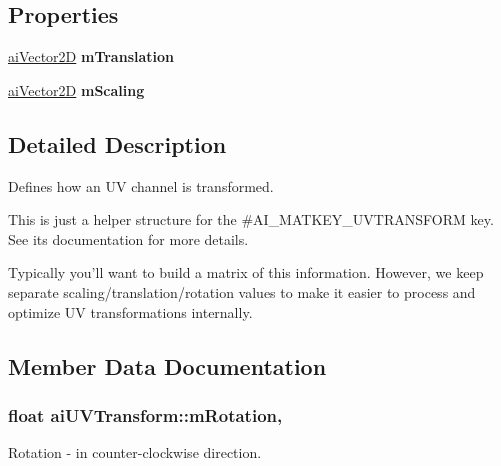 \subsection*{Properties}
\begin{DoxyCompactItemize}
\item 
\hypertarget{structai_u_v_transform_af110a480a92019dc2007ccee661f3029}{\hyperlink{structai_vector2_d}{ai\+Vector2\+D} {\bfseries m\+Translation}}\label{structai_u_v_transform_af110a480a92019dc2007ccee661f3029}

\item 
\hypertarget{structai_u_v_transform_a63d73c810c16ca34589f0d5012904200}{\hyperlink{structai_vector2_d}{ai\+Vector2\+D} {\bfseries m\+Scaling}}\label{structai_u_v_transform_a63d73c810c16ca34589f0d5012904200}

\end{DoxyCompactItemize}


\subsection{Detailed Description}
Defines how an U\+V channel is transformed. 

This is just a helper structure for the \#\+A\+I\+\_\+\+M\+A\+T\+K\+E\+Y\+\_\+\+U\+V\+T\+R\+A\+N\+S\+F\+O\+R\+M key. See its documentation for more details.

Typically you'll want to build a matrix of this information. However, we keep separate scaling/translation/rotation values to make it easier to process and optimize U\+V transformations internally. 

\subsection{Member Data Documentation}
\hypertarget{structai_u_v_transform_aa8dcf39ccd39f786b3f5f163bd663792}{
\subsubsection[{m\+Rotation}]{\setlength{\rightskip}{0pt plus 5cm}float ai\+U\+V\+Transform\+::m\+Rotation\hspace{0.3cm}{\ttfamily [get]}, {\ttfamily [set]}}}\label{structai_u_v_transform_aa8dcf39ccd39f786b3f5f163bd663792}
Rotation -\/ in counter-\/clockwise direction.

